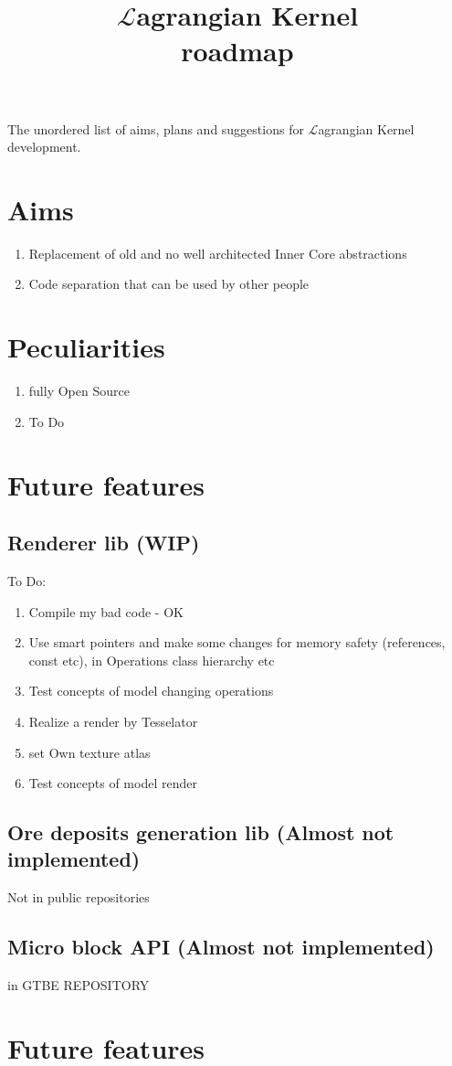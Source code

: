 \documentclass[12pt]{article}
\title{$\mathcal{L}$agrangian Kernel \\ roadmap}
\begin{document}
	\maketitle

	The unordered list of aims, plans and suggestions for $\mathcal{L}$agrangian Kernel development.

	\section{Aims}
	\begin{enumerate}
		\item Replacement of old and no well architected Inner Core abstractions 
		\item Code separation that can be used by other people
	\end{enumerate}

	\section{Peculiarities}

	\begin{enumerate}
	\item fully Open Source
	\item To Do
	\end{enumerate}

	\section{Future features}

	\subsection{Renderer lib (WIP)}
	To Do:

	\begin{enumerate}
		\item Compile my bad code - OK
		\item Use smart pointers and make some changes for memory safety (references, const etc), in Operations class hierarchy etc
		\item Test concepts of model changing operations
		\item Realize a render by Tesselator
		\item set Own texture atlas
		\item Test concepts of model render
	\end{enumerate}
	
	\subsection{Ore deposits generation lib (Almost not implemented)} 
	
	Not in public repositories

	\subsection{Micro block API (Almost not implemented)} 
	
	in GTBE REPOSITORY

	\section{Future features}
\end{document}
